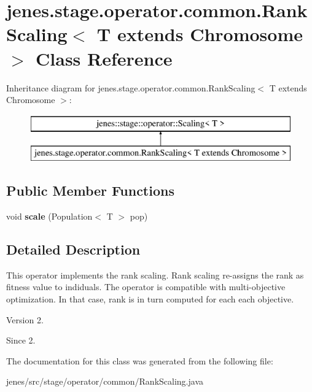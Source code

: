 \hypertarget{classjenes_1_1stage_1_1operator_1_1common_1_1_rank_scaling_3_01_t_01extends_01_chromosome_01_4}{\section{jenes.\-stage.\-operator.\-common.\-Rank\-Scaling$<$ T extends Chromosome $>$ Class Reference}
\label{classjenes_1_1stage_1_1operator_1_1common_1_1_rank_scaling_3_01_t_01extends_01_chromosome_01_4}
}
Inheritance diagram for jenes.\-stage.\-operator.\-common.\-Rank\-Scaling$<$ T extends Chromosome $>$\-:\begin{figure}[H]
\begin{center}
\leavevmode
\includegraphics[height=2.000000cm]{classjenes_1_1stage_1_1operator_1_1common_1_1_rank_scaling_3_01_t_01extends_01_chromosome_01_4}
\end{center}
\end{figure}
\subsection*{Public Member Functions}
\begin{DoxyCompactItemize}
\item 
\hypertarget{classjenes_1_1stage_1_1operator_1_1common_1_1_rank_scaling_3_01_t_01extends_01_chromosome_01_4_a8158f18c672b8764a11ba70a52514132}{void {\bfseries scale} (Population$<$ T $>$ pop)}\label{classjenes_1_1stage_1_1operator_1_1common_1_1_rank_scaling_3_01_t_01extends_01_chromosome_01_4_a8158f18c672b8764a11ba70a52514132}

\end{DoxyCompactItemize}


\subsection{Detailed Description}
This operator implements the rank scaling. Rank scaling re-\/assigns the rank as fitness value to indiduals. The operator is compatible with multi-\/objective optimization. In that case, rank is in turn computed for each each objective.

\begin{DoxyVersion}{Version}
2. 
\end{DoxyVersion}
\begin{DoxySince}{Since}
2. 
\end{DoxySince}


The documentation for this class was generated from the following file\-:\begin{DoxyCompactItemize}
\item 
jenes/src/stage/operator/common/Rank\-Scaling.\-java\end{DoxyCompactItemize}
